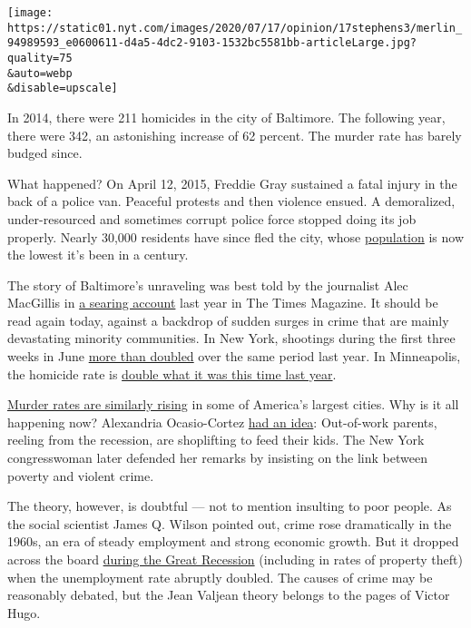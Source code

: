 \texttt{[image: https://static01.nyt.com/images/2020/07/17/opinion/17stephens3/merlin\_94989593\_e0600611-d4a5-4dc2-9103-1532bc5581bb-articleLarge.jpg?quality=75\\\&auto=webp\\\&disable=upscale]}

In 2014, there were 211 homicides in the city of Baltimore. The
following year, there were 342, an astonishing increase of 62 percent.
The murder rate has barely budged since.

What happened? On April 12, 2015, Freddie Gray sustained a fatal injury
in the back of a police van. Peaceful protests and then violence ensued.
A demoralized, under-resourced and sometimes corrupt police force
stopped doing its job properly. Nearly 30,000 residents have since fled
the city, whose
\href{https://www.baltimoresun.com/maryland/baltimore-city/bs-md-ci-population-estimates-20200326-nebck2k2anbwrcfsbknphsfgwi-story.html}{population}
is now the lowest it's been in a century.

The story of Baltimore's unraveling was best told by the journalist Alec
MacGillis in
\href{https://www.nytimes.com/2019/03/12/magazine/baltimore-tragedy-crime.html}{a
searing account} last year in The Times Magazine. It should be read
again today, against a backdrop of sudden surges in crime that are
mainly devastating minority communities. In New York, shootings during
the first three weeks in June
\href{https://www.nytimes.com/2020/06/23/nyregion/nyc-shootings-surge.html?searchResultPosition=6}{more
than doubled} over the same period last year. In Minneapolis, the
homicide rate is
\href{https://www.startribune.com/as-gun-violence-continues-minneapolis-marchers-plead-for-peace/571713702/}{double
what it was this time last year}.

\href{https://www.nytimes.com/2020/07/06/upshot/murders-rising-crime-coronavirus.html}{Murder
rates are similarly rising} in some of America's largest cities. Why is
it all happening now? Alexandria Ocasio-Cortez
\href{https://www.nydailynews.com/news/politics/ny-ocasio-cortez-crime-nyc-shoplifting-bread-hungry-20200712-4ga4tm6vzze7ricmk2o2er4iwa-story.html}{had
an idea}: Out-of-work parents, reeling from the recession, are
shoplifting to feed their kids. The New York congresswoman later
defended her remarks by insisting on the link between poverty and
violent crime.

The theory, however, is doubtful --- not to mention insulting to poor
people. As the social scientist James Q. Wilson pointed out, crime rose
dramatically in the 1960s, an era of steady employment and strong
economic growth. But it dropped across the board
\href{https://www.city-journal.org/html/crime-and-great-recession-13399.html}{during
the Great Recession} (including in rates of property theft) when the
unemployment rate abruptly doubled. The causes of crime may be
reasonably debated, but the Jean Valjean theory belongs to the pages of
Victor Hugo.

